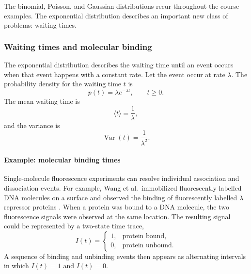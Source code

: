 \begin{table}[h]
\caption{Common probability distributions and representative examples.
The geometric distribution is defined here as the number of failures before the first success.}
\label{tab: prob_distributions}
\end{table}



The binomial, Poisson, and Gaussian distributions recur throughout the course examples.
The exponential distribution describes an important new class of problems: waiting times.


\subsubsection{Waiting times and molecular binding}
\label{sec:waiting}


The exponential distribution describes the waiting time until an event occurs when that event happens with a constant rate.
Let the event occur at rate $\lambda$.
The probability density for the waiting time $t$ is
\[
    \boxed{p(t)=\lambda e^{-\lambda t}, \qquad t\geq0.}
\]
The mean waiting time is
\[
    \langle t\rangle = \frac{1}{\lambda},
\]
and the variance is
\[
    \operatorname{Var}(t)=\frac{1}{\lambda^2}.
\]

\paragraph{Example: molecular binding times}

Single-molecule fluorescence experiments can resolve individual association and dissociation events.
For example, Wang et al.\ immobilized fluorescently labelled DNA molecules on a surface and observed the binding of fluorescently labelled $\lambda$ repressor proteins \cite{wang2009quantitative}.
When a protein was bound to a DNA molecule, the two fluorescence signals were observed at the same location.
The resulting signal could be represented by a two-state time trace,
\[
    I(t)=
    \begin{cases}
        1, & \text{protein bound},\\
        0, & \text{protein unbound}.
    \end{cases}
\]
A sequence of binding and unbinding events then appears as alternating intervals in which $I(t)=1$ and $I(t)=0$.
% 
